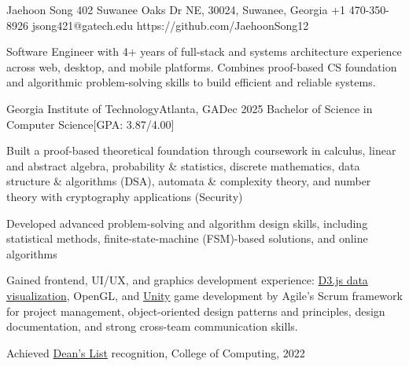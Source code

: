 % 
\begin{resume-header}{Jaehoon Song}
  {402 Suwanee Oaks Dr NE, 30024, Suwanee, Georgia}
  {+1 470-350-8926}
  {jsong421@gatech.edu}
  {https://github.com/JaehoonSong12}
\end{resume-header}
\begin{resume-objective}
Software Engineer with 4+ years of full-stack and systems 
architecture experience across web, desktop, and mobile 
platforms. Combines proof-based CS foundation and algorithmic problem-solving skills 
to build efficient and reliable systems.
\end{resume-objective}
\begin{resume-itemize}
  {Georgia Institute of Technology}{Atlanta, GA}{Dec 2025}
  {Bachelor of Science in Computer Science}[GPA: 3.87/4.00]
    \item Built a proof-based theoretical foundation through coursework in calculus, 
    linear and abstract algebra, probability \& statistics, discrete mathematics, 
    data structure \& algorithms (DSA), automata \& complexity theory, and number 
    theory with cryptography applications (Security)
    \item Developed advanced problem-solving and algorithm design skills, 
    including statistical methods, finite-state-machine (FSM)-based solutions, 
    and online algorithms
    \item Gained frontend, UI/UX, and graphics development experience: 
    \href{https://jaehoonsong12.github.io/}{D3.js data visualization}, OpenGL, 
    and \href{https://github.com/YundaeLeeSong/ydjs-references/tree/main/project2409-game_shadowwalker}{Unity} 
    game development
    by Agile's Scrum framework for project management, 
    object-oriented design patterns and principles, 
    design documentation, and 
    strong cross-team communication skills.
    \item Achieved \href{https://gatech.meritpages.com/stories/Jaehoon-Song-Named-to-Dean-s-List-at-Georgia-Tech-for-the-Summer-2022-Semester/104219189}{Dean's List} recognition, College of Computing, 2022
\end{resume-itemize}
